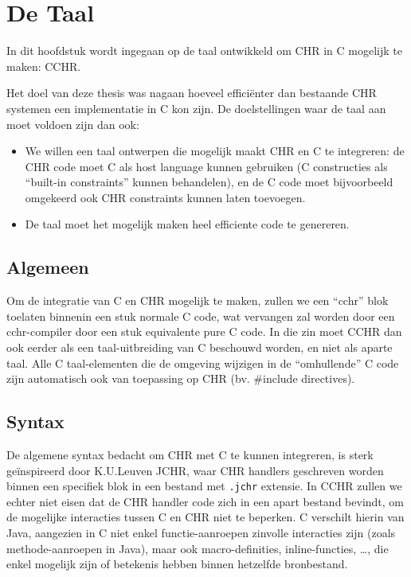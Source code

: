 \chapter{De Taal}

In dit hoofdstuk wordt ingegaan op de taal ontwikkeld om CHR in C mogelijk te maken: CCHR.

Het doel van deze thesis was nagaan hoeveel effici\"enter dan bestaande CHR systemen een implementatie
in C kon zijn. De doelstellingen waar de taal aan moet voldoen zijn dan ook: \begin{itemize}
  \item We willen een taal ontwerpen die mogelijk maakt CHR en C te integreren: de CHR code moet C
        als host language kunnen gebruiken (C constructies als ``built-in constraints'' kunnen
	behandelen), en de C code moet bijvoorbeeld omgekeerd ook CHR constraints kunnen laten toevoegen.
  \item De taal moet het mogelijk maken heel efficiente code te genereren.
\end{itemize}

\section{Algemeen}

Om de integratie van C en CHR mogelijk te maken, zullen we een ``cchr'' blok toelaten binnenin een stuk normale
C code, wat vervangen zal worden door een cchr-compiler door een stuk equivalente pure C code. In die zin moet
CCHR dan ook eerder als een taal-uitbreiding van C beschouwd worden, en niet als aparte taal. Alle C taal-elementen
die de omgeving wijzigen in de ``omhullende'' C code zijn automatisch ook van toepassing op CHR (bv. \#include directives).

\section{Syntax}

De algemene syntax bedacht om CHR met C te kunnen integreren, is sterk ge\"inspireerd door K.U.Leuven JCHR, waar
CHR handlers geschreven worden binnen een specifiek blok in een bestand met {\tt .jchr} extensie. In CCHR zullen we
echter niet eisen dat de CHR handler code zich in een apart bestand bevindt, om de mogelijke interacties tussen
C en CHR niet te beperken. C verschilt hierin van Java, aangezien in C niet enkel functie-aanroepen zinvolle interacties
zijn (zoals methode-aanroepen in Java), maar ook macro-definities, inline-functies, \ldots, die enkel mogelijk zijn of
betekenis hebben binnen hetzelfde bronbestand.

